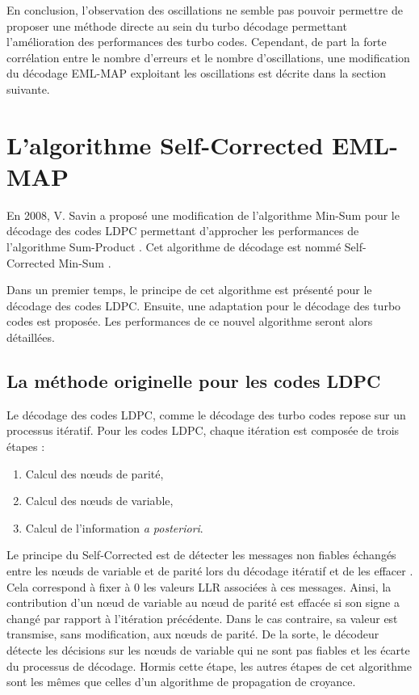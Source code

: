En conclusion, l'observation des oscillations ne semble pas pouvoir permettre de proposer une méthode directe au sein du 
turbo décodage permettant l'amélioration des performances des turbo codes. Cependant, de part la forte corrélation entre 
le nombre d'erreurs et le nombre d'oscillations, une modification du décodage EML-MAP exploitant les oscillations est décrite 
dans la section suivante.
\section{L’algorithme Self-Corrected EML-MAP}
En 2008, V. Savin  a proposé une modification de l'algorithme Min-Sum \cite{wiberg1996codes} pour le décodage des codes 
LDPC permettant d'approcher les performances de l'algorithme Sum-Product \cite{wiberg1996codes}. Cet algorithme de 
décodage est nommé Self-Corrected Min-Sum \cite{savin_sc}.

Dans un premier temps, le principe de cet algorithme est présenté pour le décodage des codes LDPC. Ensuite, une 
adaptation pour le décodage des turbo codes est proposée. Les performances de ce nouvel algorithme seront alors détaillées.

\subsection{La méthode originelle pour les codes LDPC}
Le décodage des codes LDPC, comme le décodage des turbo codes repose sur un processus itératif. Pour les codes LDPC,
chaque itération est composée de trois étapes : 
\begin{enumerate}
	\item Calcul des nœuds de parité,%
	\item Calcul des nœuds de variable,%
	\item Calcul de l'information \textit{a posteriori}.%
\end{enumerate}
Le principe du Self-Corrected est de détecter les messages non fiables échangés entre les nœuds de variable et de parité 
lors du décodage itératif et de les \og 
effacer \fg. Cela correspond à fixer à 0 les valeurs LLR associées à ces messages. Ainsi, la contribution d'un nœud de 
variable au nœud de parité est effacée si son signe a changé par rapport à l’itération précédente. Dans le cas contraire, sa 
valeur est transmise, sans modification, aux nœuds de 
parité. De la sorte, le décodeur détecte les décisions sur les nœuds de variable qui ne sont pas fiables et les écarte du processus de décodage. Hormis cette 
étape, les autres étapes de cet algorithme sont les mêmes que celles d'un algorithme de propagation de croyance.

